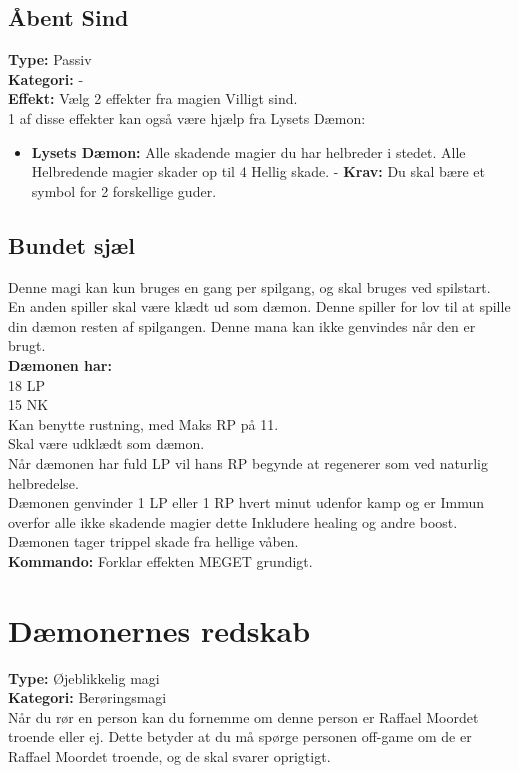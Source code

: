 \subsection{Åbent Sind}
\textbf{Type:} Passiv\\
\textbf{Kategori:} -\\
\textbf{Effekt:} Vælg 2 effekter fra magien Villigt sind.\\
1 af disse effekter kan også være hjælp fra Lysets Dæmon:
\begin{itemize}
    \item \textbf{Lysets Dæmon:} Alle skadende magier du har helbreder i stedet. Alle Helbredende magier skader op til 4 Hellig skade. - \textbf{Krav:} Du skal bære et symbol for 2 forskellige guder.
\end{itemize}

\subsection{Bundet sjæl}
Denne magi kan kun bruges en gang per spilgang, og skal bruges ved spilstart. En anden spiller skal være klædt ud som dæmon. Denne spiller for lov til at spille din dæmon resten af spilgangen. Denne mana kan ikke genvindes når den er brugt.\\
\textbf{Dæmonen har:}\\
18 LP\\ 
15 NK\\
Kan benytte rustning, med Maks RP på 11.\\
Skal være udklædt som dæmon.\\
Når dæmonen har fuld LP vil hans RP begynde at regenerer som ved naturlig helbredelse.\\ 
Dæmonen genvinder 1 LP eller 1 RP hvert minut udenfor kamp og er Immun overfor alle ikke skadende magier dette Inkludere healing og andre boost.\\
Dæmonen tager trippel skade fra hellige våben.\\
\textbf{Kommando:} Forklar effekten MEGET grundigt.

\section{Dæmonernes redskab}
\textbf{Type:} Øjeblikkelig magi\\
\textbf{Kategori:} Berøringsmagi\\
Når du rør en person kan du fornemme om denne person er Raffael Moordet troende eller ej. Dette betyder at du må spørge personen off-game om de er Raffael Moordet troende, og de skal svarer oprigtigt.

